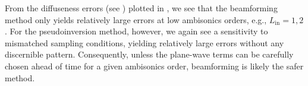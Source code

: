 From the diffuseness errors (see ) plotted in , we see that the beamforming method only yields relatively large errors at low ambisonics orders, e.g., $L_\text{in} = 1,2$.
For the pseudoinversion method, however, we again see a sensitivity to mismatched sampling conditions, yielding relatively large errors without any discernible pattern.
Consequently, unless the plane-wave terms can be carefully chosen ahead of time for a given ambisonics order, beamforming is likely the safer method.